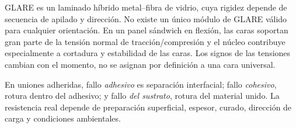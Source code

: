 GLARE es un laminado híbrido metal--fibra de vidrio, cuya rigidez depende de secuencia de apilado y dirección. No existe un único módulo de GLARE válido para cualquier orientación. En un panel sándwich en flexión, las caras soportan gran parte de la tensión normal de tracción/compresión y el núcleo contribuye especialmente a cortadura y estabilidad de las caras. Los signos de las tensiones cambian con el momento, no se asignan por definición a una cara universal.

En uniones adheridas, fallo \emph{adhesivo} es separación interfacial; fallo \emph{cohesivo}, rotura dentro del adhesivo; y fallo \emph{del sustrato}, rotura del material unido. La resistencia real depende de preparación superficial, espesor, curado, dirección de carga y condiciones ambientales.


